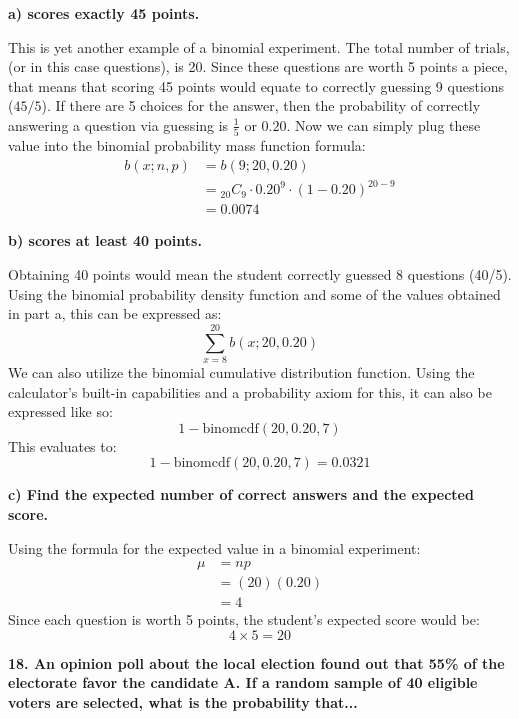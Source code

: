 \documentclass[12pt, letter]{article}
\begin{document}
\qquad \textbf{a) scores exactly 45 points.}
\begin{center}
	This is yet another example of a binomial experiment. The total number of trials, (or in this case questions), is 20. Since these questions are worth 5 points a piece, that means that scoring 45 points would equate to correctly guessing 9 questions ($45/5$). If there are 5 choices for the answer, then the probability of correctly answering a question via guessing is $\frac{1}{5}$ or $0.20$. Now we can simply plug these value into the binomial probability mass function formula:
	\begin{align*}
		b(x;n,p) &= b(9;20,0.20) \\
		&= {}_{20}C_{9} \cdot 0.20^{9} \cdot (1-0.20)^{20-9} \\
		&= \boxed{0.0074}
	\end{align*}
\end{center}

\pagebreak

\qquad \textbf{b) scores at least 40 points.}
\begin{center}
	Obtaining 40 points would mean the student correctly guessed 8 questions (40/5). Using the binomial probability density function and some of the values obtained in part a, this can be expressed as:
	$$\sum_{x=8}^{20} b(x;20,0.20)$$
	We can also utilize the binomial cumulative distribution function. Using the calculator's built-in capabilities and a probability axiom for this, it can also be expressed like so:
	$$1 - \text{binomcdf}(20,0.20,7)$$
	This evaluates to:
	$$1 - \text{binomcdf}(20,0.20,7)=\boxed{0.0321}$$
\end{center}

\qquad \textbf{c) Find the expected number of correct answers and the expected score.}
\begin{center}
	Using the formula for the expected value in a binomial experiment:
	\begin{align*}
		\mu &= np \\
		&= (20)(0.20) \\
		&= \boxed{4}
	\end{align*}
	Since each question is worth 5 points, the student's expected score would be:
	$$4 \times 5 = \boxed{20}$$
\end{center}

\textbf{18. An opinion poll about the local election found out that 55\% of the electorate favor the candidate A. If a random sample of 40 eligible voters are selected, what is the probability that...}
\end{document}
